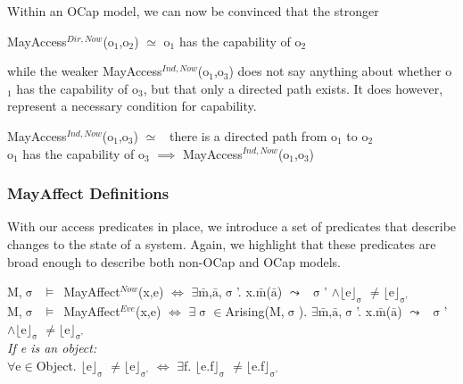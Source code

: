 \documentclass[a4paper,11pt, twoside,twocolumn]{article}
\newenvironment{logic}[1][]
{\begin{flushleft} \small }
{\end{flushleft}}
\newcommand{\loin}{$\in$}
\newcommand{\loforall}{$\forall$}
\newcommand{\loexists}{$\exists$}
\newcommand{\loand}{$\land$}
\newcommand{\loneq} {$\neq$}
\newcommand{\losimeq} {$\simeq$}
\newcommand{\loimplies}{$\implies$}
\newcommand{\losigma}{$\upsigma$}
\newcommand{\loturns} {$\vDash$}
\newcommand{\loiff} {$\iff$}
\newcommand{\loleadsto} {$\leadsto$}
\newcommand{\loexec}[2] {$\lfloor$#1$\rfloor _{\text{#2}}$}
\newcommand{\loconj}[1] {$\bar{\text{#1}}$}
\newcommand{\ablock} {\null\qquad}
\begin{document}
Within an OCap model, we can now be convinced that the stronger
\begin{logic}
MayAccess$^{Dir,Now}$(o$_1$,o$_2$) \losimeq \linebreak
\ablock o$_1$ has the capability of o$_2$\end{logic}
while the weaker MayAccess$^{Ind,Now}$(o$_1$,o$_3$) does not say anything about whether o$_1$ has the capability of o$_3$, but that only a directed path exists. It does however, represent a necessary condition for capability.
\begin{logic}
MayAccess$^{Ind,Now}$(o$_1$,o$_3$) \losimeq\ \linebreak
\ablock there is a directed path from o$_1$ to o$_2$\linebreak
\\
o$_1$ has the capability of o$_3$ \loimplies \linebreak
\ablock MayAccess$^{Ind,Now}$(o$_1$,o$_3$)\end{logic}
\subsubsection{MayAffect Definitions}
With our access predicates in place, we introduce a set of predicates that describe changes to the state of a system. Again, we highlight that these predicates are broad enough to describe both non-OCap and OCap models. 
\begin{logic}
M,\losigma\ \loturns\ MayAffect$^{Now}$(x,e) \loiff \linebreak
\ablock \loexists \loconj{m},\loconj{a},\losigma'. x.\loconj{m}(\loconj{a}) \loleadsto\ \losigma' \loand \loexec{e}{\losigma} \loneq \loexec{e}{\losigma'}
\linebreak \\
M,\losigma\ \loturns\ MayAffect$^{Eve}$(x,e) \loiff \linebreak
\ablock \loexists \losigma \loin Arising(M,\losigma).\linebreak
\ablock \loexists \loconj{m},\loconj{a},\losigma'. x.\loconj{m}(\loconj{a}) \loleadsto\ \losigma' \loand \loexec{e}{\losigma} \loneq \loexec{e}{\losigma'}
\linebreak \\
\textit{If e is an object:} \\
\loforall e\loin Object. \loexec{e}{\losigma} \loneq \loexec{e}{\losigma'} \loiff \linebreak
\ablock \loexists f. \loexec{e.f}{\losigma} \loneq \loexec{e.f}{\losigma'}
\end{logic}
\end{document}
